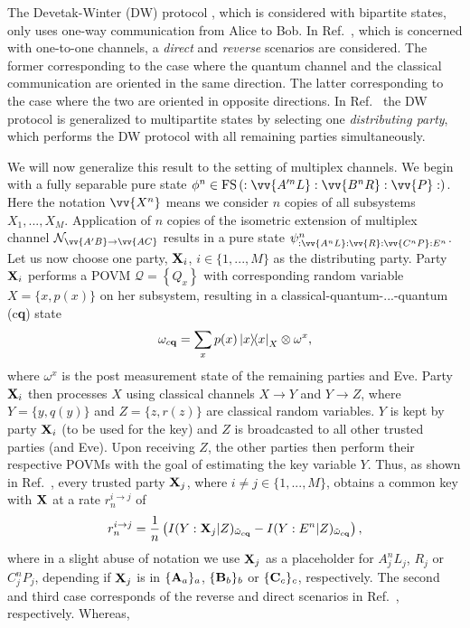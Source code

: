 \documentclass[aps,pra,twocolumn,superscriptaddress,longbibliography]{revtex4-1}
\def\FS{\operatorname{FS}}
\def\({\left(}
\def\){\right)}
\newcommand{\mc}[1]{\mathcal{#1}}
\begin{document}
The Devetak-Winter (DW) protocol \cite{DW05}, which is considered with bipartite states, only uses one-way communication from Alice to Bob. In Ref.~\cite{pirandola2009direct}, which is concerned with one-to-one channels, a {\it direct} and {\it reverse} scenarios are considered. The former corresponding to the case where the quantum channel and the classical communication are oriented in the same direction. The latter corresponding to the case where the two are oriented in opposite directions. In Ref.~\cite{AH09} the DW protocol is generalized to multipartite states by selecting one {\it distributing party}, which performs the DW protocol with all remaining parties simultaneously. 


We will now generalize this result to the setting of multiplex channels. We begin with a fully separable pure state $\phi^n\in\FS\left(:\vv{A'^{ n}L}:\vv{B^{ n}R}:\vv{P}:\right)$. Here the notation $\vv{X^{ n}}$ means we consider $n$ copies of all subsystems $X_1,...,X_M$. Application of $n$ copies of the isometric extension of multiplex channel $\mc{N}_{\vv{A'B}\to\vv{AC}}$ results in a pure state $\psi^n_{:\vv{A^{ n}L}:\vv{R}:\vv{C^{ n}P}:E^{n}}$. Let us now choose one party, ${\bf X}_i$, $i\in\{1,...,M\}$ as the distributing party. Party ${\bf X}_i$ performs a POVM $\mc{Q}=\left\{Q_x\right\}$ with corresponding random variable $X=\{x,p(x)\}$ on her subsystem, resulting in a classical-quantum-...-quantum (c{\bf q}) state
\begin{equation}
\omega_{c{\bf q}}=\sum_xp(x)\op{x}_{X}\otimes\omega^x,%
\end{equation}
where $\omega^x$ is the post measurement state of the remaining parties and Eve. Party ${\bf X}_i$ then processes $X$ using classical channels $X\to Y$ and $Y\to Z$, where $Y=\{y,q(y)\}$ and  $Z=\{z,r(z)\}$ are classical random variables. $Y$ is kept by party ${\bf X}_i$ (to be used for the key) and $Z$ is broadcasted to all other trusted parties (and Eve). Upon receiving $Z$, the other parties then perform their respective POVMs with the goal of estimating the key variable $Y$. Thus, as shown in Ref.~\cite{DW05}, every trusted party ${\bf X}_j$, where $i\neq j\in\{1,...,M\}$, obtains a common key with ${\bf X}$ at a rate $r_n^{i\to j}$ of 
\begin{equation}\label{eq59}
r_n^{i\to j}=\frac{1}{n}\(I(Y:{\bf X}_j|Z)_{\tilde{\omega}_{c{\bf q}}}-I(Y:E^n|Z)_{\tilde{\omega}_{c{\bf q}}}\),
\end{equation}
where in a slight abuse of notation we use ${\bf X}_j$ as a placeholder for $A^n_jL_j$, $R_j$ or $C^n_jP_j$, depending if ${\bf X}_j$ is in $\{{\bf A}_a\}_a$, $\{{\bf B}_b\}_b$ or $\{{\bf C}_c\}_c$, respectively. The second and third case corresponds of the reverse and direct scenarios in Ref.~\cite{pirandola2009direct}, respectively. Whereas,
\end{document}
